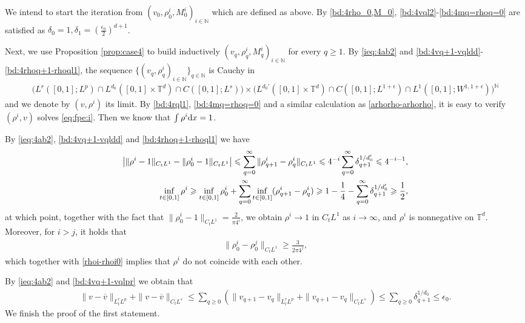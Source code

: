 \documentclass[UTF-8,reqno]{amsart}
\numberwithin{equation}{section}
\theoremstyle{definition}
\def\({{\Big(}}
\def\){{\Big)}}
\def\dif{{\mathord{{\rm d}}}}
\def\mN{{\mathbb N}}
\def\mT{{\mathbb T}}
\def\geq{\geqslant}
\def\leq{\leqslant}
\def\({{\Big(}}
\def\){{\Big)}}
\def\dif{{\mathord{{\rm d}}}}
\def\geq{\geqslant}
\def\leq{\leqslant}
\def\N{\mathbb N} \def\kk{\zeta} \def\m{{\bf m}}
\begin{document}
We intend to start the iteration from 
$(v_0, \rho^{i}_0,  M^{i}_0)_{i\in\mN}$ which are defined as above. 
By \eqref{bd:4rho_0,M_0},  \eqref{bd:4vql2}-\eqref{bd:4mq=rhoq=0} are satisfied as $\delta_0=1,\delta_1=(\frac{\epsilon_0}{2})^{d+1}$.


Next, we use Proposition \ref{prop:case4} to build inductively $(v_q,\rho^{i}_q, M^{i}_q)_{i\in\mN}$ for every $q \geq 1$. By \eqref{ieq:4ab2} and \eqref{bd:4vq+1-vqldd}-\eqref{bd:4rhoq+1-rhoql1}, the sequence $\{(v_q,\rho^{i}_q)_{i\in\mN}\}_{q\in \N}$ is
Cauchy in 
\begin{align*}
    \(L^r([0,1];L^p)\cap L^{d_0}([0,1]\times \mT^d)\cap C([0,1];L^s)\)\times \(L^{d_0'}([0,1]\times \mT^d)\cap C([0,1];L^{1+\epsilon})\cap L^1([0,1];W^{1,1+\epsilon})\)^{\mN}\end{align*}
     and we denote by $(v,\rho^{i})$ its limit.    
By \eqref{bd:4rql1}, \eqref{bd:4mq=rhoq=0} and a similar calculation as \eqref{arhorho-arhorho}, it is easy to verify $(\rho^{i},v)$  solves   \eqref{eq:fpe:i}.  Then we know that $\int \rho^{i}\dif x=1$.
      
   

 By \eqref{ieq:4ab2}, \eqref{bd:4vq+1-vqldd} and \eqref{bd:4rhoq+1-rhoql1} we have
\begin{align} 
 \left|   \|\rho^i-1\|_{C_tL^1}- \| \rho^{i}_0-1\|_{C_tL^1}\right|\leq \sum_{q=0}^\infty\|\rho^{i}_{q+1}-\rho^{i}_{q}\|_{C_tL^1}\leq
4^{-i}\sum_{q=0}^\infty\delta_{q+1}^{1/{d_0'}}\leq 4^{-i-1},\label{rhoi-rhoi0}\\
\inf_{t\in [0,1]}\rho^i \geq \inf_{t\in [0,1]} \rho_0^i +
\sum_{q=0}^\infty \inf_{t\in [0,1]}(\rho_{q+1}^i- \rho_q^i) \geq1-\frac14-\sum_{q=0}^\infty \delta_{q+1}^{1/d_0'}\geq \frac12,\notag
\end{align}
at which point, together with the fact that $\| \rho^{i}_0-1\|_{C_tL^1}=\frac{2}{\pi4^i}$, we obtain $\rho^i\to 1$ in $ C_tL^1$ as $i\to\infty$, and  
 $\rho^{i}$ is nonnegative on $\mathbb{T}^d$. Moreover, for $i>j$, it holds that 
 \begin{align*}
     \| \rho^{i}_0-\rho^{j}_0\|_{C_tL^1}\geq \frac{3}{2\pi4^j},
 \end{align*}
 which together with \eqref{rhoi-rhoi0} implies that $\rho^i$
 do not coincide with each other. 

 By \eqref{ieq:4ab2} and \eqref{bd:4vq+1-vqlpr} we obtain that  \begin{align*}
    \|v -\overline v \|_{L^{r}_tL^{p}}+\|v -\overline v \|_{C_tL^s}\leq  \sum_{q\geq0}( \|v_{q+1}-v_{q}\|_{L^{r}_tL^{p}}+\|v_{q+1}-v_q\|_{C_tL^s})\leq
\sum_{q\geq0}\delta_{q+1}^{1/d_0}\leq\epsilon_0.
\end{align*}
 We finish the proof of the first statement. 
\end{document}

